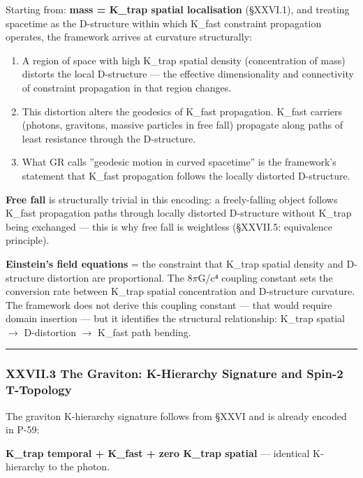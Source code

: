 \documentclass[12pt,a4paper]{article}
\begin{document}
Starting from: \textbf{mass = K\_trap spatial localisation} (§XXVI.1), and treating spacetime as the D-structure within which K\_fast constraint propagation operates, the framework arrives at curvature structurally:

\begin{enumerate}
    \item A region of space with high K\_trap spatial density (concentration of mass) distorts the local D-structure --- the effective dimensionality and connectivity of constraint propagation in that region changes.
    \item This distortion alters the geodesics of K\_fast propagation. K\_fast carriers (photons, gravitons, massive particles in free fall) propagate along paths of least resistance through the D-structure.
    \item What GR calls ''geodesic motion in curved spacetime'' is the framework's statement that K\_fast propagation follows the locally distorted D-structure.
\end{enumerate}

\textbf{Free fall} is structurally trivial in this encoding: a freely-falling object follows K\_fast propagation paths through locally distorted D-structure without K\_trap being exchanged --- this is why free fall is weightless (§XXVII.5: equivalence principle).

\textbf{Einstein's field equations} = the constraint that K\_trap spatial density and D-structure distortion are proportional. The 8$\pi$G/c⁴ coupling constant sets the conversion rate between K\_trap spatial concentration and D-structure curvature. The framework does not derive this coupling constant --- that would require domain insertion --- but it identifies the structural relationship: K\_trap spatial $\rightarrow$ D-distortion $\rightarrow$ K\_fast path bending.

\begin{center}
\rule{0.5\textwidth}{0.4pt}
\end{center}

\subsubsection{XXVII.3 The Graviton: K-Hierarchy Signature and Spin-2 T-Topology}

The graviton K-hierarchy signature follows from §XXVI and is already encoded in P-59:

\textbf{K\_trap temporal + K\_fast + zero K\_trap spatial} --- identical K-hierarchy to the photon.
\end{document}
